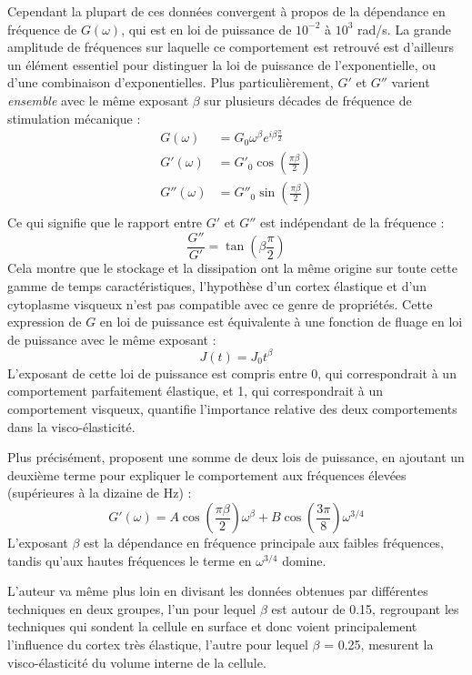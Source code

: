 Cependant la plupart de ces données convergent à propos de la dépendance en fréquence de $G(\omega)$, qui est en loi de puissance de $10^{-2}$ à $10^3$ rad/s. La grande amplitude de fréquences sur laquelle ce comportement est retrouvé est d'ailleurs un élément essentiel pour distinguer la loi de puissance de l'exponentielle, ou d'une combinaison d'exponentielles. Plus particulièrement, $G'$ et $G''$ varient \emph{ensemble} avec le même exposant $\beta$ sur plusieurs décades de fréquence de stimulation mécanique : 
\begin{align}
G(\omega)&=G_0 \omega^{\beta} e^{i \beta \frac{\pi}{2}} \\
G'(\omega)&=G'_0 \cos \left( \frac{\pi \beta}{2} \right) \\
G''( \omega)&=G''_0 \sin \left( \frac{\pi \beta}{2} \right) \\
\end{align} 
Ce qui signifie que le rapport entre $G'$ et $G''$ est indépendant de la fréquence : 
$$ \frac{G''}{G'} = \tan \left( \beta \frac{\pi}{2} \right)$$
Cela montre que le stockage et la dissipation ont la même origine sur toute cette gamme de temps caractéristiques, l'hypothèse d'un cortex élastique et d'un cytoplasme visqueux n'est pas compatible avec ce genre de propriétés. 
Cette expression de $G$ en loi de puissance est équivalente à une fonction de fluage en loi de puissance avec le même exposant : 
$$ J(t)= J_0 t^{\beta}$$
L'exposant de cette loi de puissance est compris entre 0, qui correspondrait à un comportement parfaitement élastique, et 1, qui correspondrait à un comportement visqueux, quantifie l'importance relative des deux comportements dans la visco-élasticité. 


 Plus précisément, \cite{hoffman_cell_2009} proposent une somme de deux lois de puissance, en ajoutant un deuxième terme pour expliquer le comportement aux fréquences élevées (supérieures à la dizaine de Hz) : 
$$G'(\omega)= A \cos \left(\frac{\pi \beta}{2}\right) \omega^{\beta} + B \cos\left(\frac{3 \pi}{8}\right) \omega^{3/4}$$
L'exposant $\beta$ est la dépendance en fréquence principale aux faibles fréquences, tandis qu'aux hautes fréquences le terme en $\omega^{3/4}$ domine. 

L'auteur va même plus loin en divisant les données obtenues par différentes techniques en deux groupes, l'un pour lequel $\beta$ est autour de 0.15, regroupant les techniques qui sondent la cellule en surface et donc voient principalement l'influence du cortex très élastique, l'autre pour lequel $\beta$ = 0.25, mesurent la visco-élasticité du volume interne de la cellule. 

